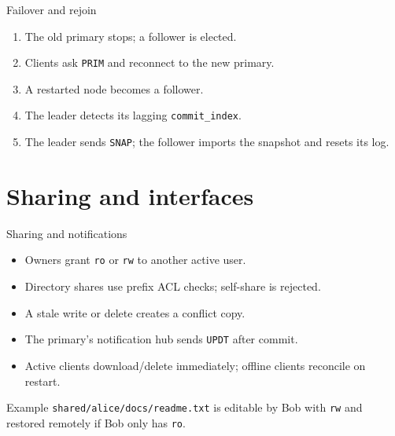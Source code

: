 \documentclass[aspectratio=169]{beamer}
\begin{document}
\begin{frame}{Failover and rejoin}
  \begin{enumerate}
    \item The old primary stops; a follower is elected.
    \item Clients ask \texttt{PRIM} and reconnect to the new primary.
    \item A restarted node becomes a follower.
    \item The leader detects its lagging \texttt{commit\_index}.
    \item The leader sends \texttt{SNAP}; the follower imports the snapshot and
      resets its log.
  \end{enumerate}
\end{frame}

\section{Sharing and interfaces}

\begin{frame}{Sharing and notifications}
  \begin{itemize}
    \item Owners grant \texttt{ro} or \texttt{rw} to another active user.
    \item Directory shares use prefix ACL checks; self-share is rejected.
    \item A stale write or delete creates a conflict copy.
    \item The primary's notification hub sends \texttt{UPDT} after commit.
    \item Active clients download/delete immediately; offline clients reconcile
      on restart.
  \end{itemize}
  \vspace{0.2cm}
  \begin{block}{Example}
    \texttt{shared/alice/docs/readme.txt} is editable by Bob with \texttt{rw}
    and restored remotely if Bob only has \texttt{ro}.
  \end{block}
\end{frame}
\end{document}

